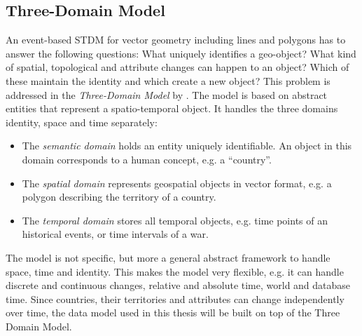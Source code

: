 

\subsection{Three-Domain Model} %
\label{sub:three_domain_model}

An event-based STDM for vector geometry including lines and polygons has to answer the following questions: What uniquely identifies a geo-object? What kind of spatial, topological and attribute changes can happen to an object? Which of these maintain the identity and which create a new object? This problem is addressed in the \emph{Three-Domain Model} by \cite{yuan96threedomain, yuan96temporal}. The model is based on abstract entities that represent a spatio-temporal object. It handles the three domains identity, space and time separately:
\begin{itemize}
  \item The \emph{semantic domain} holds an entity uniquely identifiable. An object in this domain corresponds to a human concept, e.g. a ``country''.
  \item The \emph{spatial domain} represents geospatial objects in vector format, e.g. a polygon describing the territory of a country.
  \item The \emph{temporal domain} stores all temporal objects, e.g. time points of an historical events, or time intervals of a war.
\end{itemize}

The model is not specific, but more a general abstract framework to handle space, time and identity. This makes the model very flexible, e.g. it can handle discrete and continuous changes, relative and absolute time, world and database time. Since countries, their territories and attributes can change independently over time, the data model used in this thesis will be built on top of the Three Domain Model.


